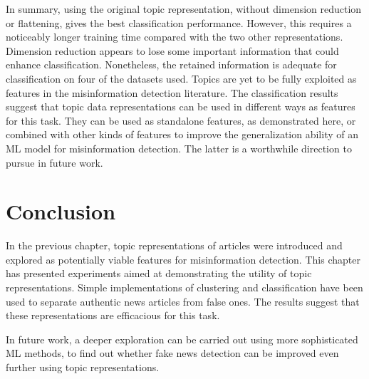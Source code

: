 In summary, using the original topic representation, without dimension reduction or flattening, gives the best classification performance. However, this requires a noticeably longer training time compared with the two other representations. Dimension reduction appears to lose some important information that could enhance classification. Nonetheless, the retained information is adequate for classification on four of the datasets used. Topics are yet to be fully exploited as features in the misinformation detection literature. The classification results suggest that topic data representations can be used in different ways as features for this task. They can be used as standalone features, as demonstrated here, or combined with other kinds of features to improve the generalization ability of an \ac{ML} model for misinformation detection. The latter is a worthwhile direction to pursue in future work.

\section{Conclusion}
\label{sec:5-conclusion}

In the previous chapter, topic representations of articles were introduced and explored as potentially viable features for misinformation detection. This chapter has presented experiments aimed at demonstrating the utility of topic representations. Simple implementations of clustering and classification have been used to separate authentic news articles from false ones. The results suggest that these representations are efficacious for this task.

In future work, a deeper exploration can be carried out using more sophisticated \ac{ML} methods, to find out whether fake news detection can be improved even further using topic representations.

